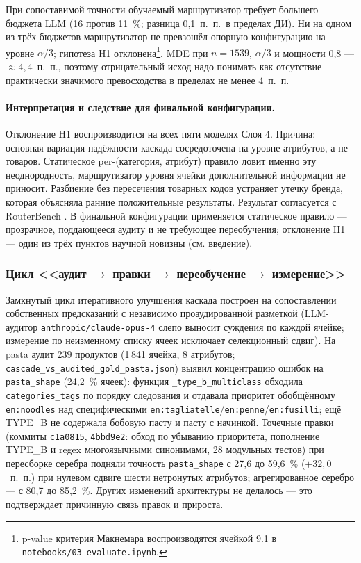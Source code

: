 При сопоставимой точности обучаемый маршрутизатор требует большего бюджета LLM (16 против 11~\%; разница 0,1~п.~п.\ в пределах ДИ). Ни на одном из трёх бюджетов маршрутизатор не превзошёл опорную конфигурацию на уровне $\alpha/3$; гипотеза H1 отклонена\footnote{p-value критерия Макнемара воспроизводятся ячейкой 9.1 в \texttt{notebooks/03\_evaluate.ipynb}.}. MDE при $n = 1539$, $\alpha/3$ и мощности 0,8 — $\approx 4{,}4$~п.~п., поэтому отрицательный исход надо понимать как отсутствие практически значимого превосходства в пределах не менее 4~п.~п.

\paragraph*{Интерпретация и следствие для финальной конфигурации.}
Отклонение H1 воспроизводится на всех пяти моделях Слоя 4. Причина: основная вариация надёжности каскада сосредоточена на уровне атрибутов, а не товаров. Статическое per-(категория, атрибут) правило ловит именно эту неоднородность, маршрутизатор уровня ячейки дополнительной информации не приносит. Разбиение без пересечения товарных кодов устраняет утечку бренда, которая объясняла ранние положительные результаты. Результат согласуется с RouterBench \cite{ref_12}. В финальной конфигурации применяется статическое правило --- прозрачное, поддающееся аудиту и не требующее переобучения; отклонение H1 --- один из трёх пунктов научной новизны (см. введение).

\subsubsection{Цикл <<аудит $\to$ правки $\to$ переобучение $\to$ измерение>>}

Замкнутый цикл итеративного улучшения каскада построен на сопоставлении собственных предсказаний с независимо проаудированной разметкой (LLM-аудитор \texttt{anthropic/claude-opus-4} слепо выносит суждения по каждой ячейке; измерение по неизменному списку ячеек исключает селекционный сдвиг). На pasta аудит 239 продуктов (1\,841 ячейка, 8 атрибутов; \texttt{cascade\_vs\_audited\_gold\_pasta.json}) выявил концентрацию ошибок на \texttt{pasta\_shape} (24,2~\% ячеек): функция \texttt{\_type\_b\_multiclass} обходила \texttt{categories\_tags} по порядку следования и отдавала приоритет обобщённому \texttt{en:noodles} над специфическими \texttt{en:tagliatelle}/\texttt{en:penne}/\texttt{en:fusilli}; ещё TYPE\_B не содержала бобовую пасту и пасту с начинкой. Точечные правки (коммиты \texttt{c1a0815}, \texttt{4bbd9e2}: обход по убыванию приоритета, пополнение TYPE\_B и regex многоязычными синонимами, 28 модульных тестов) при пересборке серебра подняли точность \texttt{pasta\_shape} с 27,6 до 59,6~\% ($+32{,}0$~п.~п.) при нулевом сдвиге шести нетронутых атрибутов; агрегированное серебро --- с 80,7 до 85,2~\%. Других изменений архитектуры не делалось — это подтверждает причинную связь правок и прироста.

